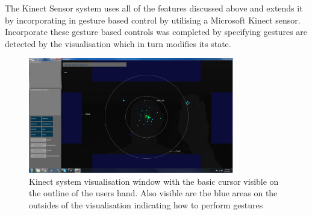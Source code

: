 The Kinect Sensor system uses all of the features discussed above and extends it
by incorporating in gesture based control by utilising a Microsoft Kinect
sensor. Incorporate these gesture based controls was completed by specifying
gestures are detected by the visualisation which in turn modifies its state. 

\begin{figure}[H]
  \centering
      \includegraphics[width=0.8\textwidth]{images/full.jpg}
  \caption[Kinect system visualisation window]{Kinect system visualisation
window with the basic cursor visible on the outline of the users hand. Also
visible are the blue areas on the outsides of the visualisation indicating how
to perform gestures}
  \label{fig:left}
\end{figure}


